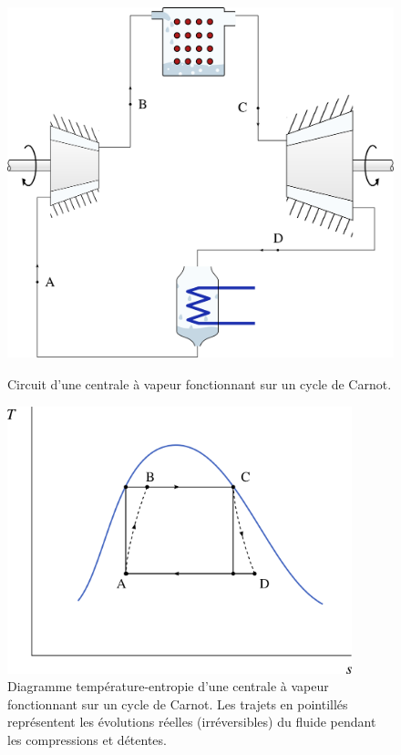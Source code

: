 		\begin{figure}
			\begin{center}
				\includegraphics[height=11cm]{images/circuit_carnot_lv.png}
			\end{center}
			\caption{Circuit d’une centrale à vapeur fonctionnant sur un cycle de Carnot.}
			\label{fig_machine_vapeur_carnot}
		\end{figure}

		\begin{figure}
			\begin{center}
				\includegraphics[width=10cm]{images/ts_lv_carnot.png}
			\end{center}
			\caption{Diagramme température-entropie d’une centrale à vapeur fonctionnant sur un cycle de Carnot. Les trajets en pointillés représentent les évolutions réelles (irréversibles) du fluide pendant les compressions et détentes.}
			\label{fig_ts_machine_vapeur_carnot}
		\end{figure}

